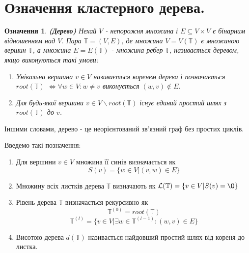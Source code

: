 \documentclass[12pt]{report}
\begin{document}
	\section{Означення кластерного дерева.}
	\newtheorem{Def}{Означення}[chapter]
	\begin{Def}
	{\bf (Дерево)} Нехай $V$ - непорожня множина і $E\subseteq V\times V$ є бінарним відношенням над $V$. Пара $\mathbb{T}=(V,E)$, де множина $V=V(\mathbb{T})$ є множиною вершин $\mathbb{T}$, а множина $E=E(\mathbb{T})$ - множина ребер $\mathbb{T}$, називається деревом, якщо виконуються такі умови:
	\begin{enumerate}
		\item[-] Унікальна вершина $v\in V$ називається коренем дерева і позначається $root(\mathbb{T})$ $\Leftrightarrow \forall w\in V:w\not=v$ виконується $(w,v)\not\in E$.
		\item[-] Для будь-якої вершини $v\in V\backslash root(\mathbb{T})$ існує єдиний простий шлях з $root(\mathbb{T})$ до $v$.
	\end{enumerate}

	\end{Def}
	Іншими словами, дерево - це неорієнтований зв'язний граф без простих циклів.
	\par Введемо такі позначення:
	\begin{enumerate}
		\item[$\bullet$] Для вершини $v\in V$ множина її синів визначається як $$S(v)=\{w\in V |(v,w)\in E \}$$
		\item[$\bullet$] Множину всіх листків дерева $\mathbb{T}$ визначають як $\mathcal{L}(\mathbb{T})=\{v\in V|S(v)=\O \}$
		\item[$\bullet$] Рівень дерева $\mathbb{T}$ визначається рекурсивно як $$\mathbb{T}^{(0)}=root(\mathbb{T})$$
		$$\mathbb{T}^{(l)}=\{v \in V|\exists w\in \mathbb{T}^{(l-1)}:(w,v)\in E\}$$
		\item[$\bullet$] Висотою дерева $d(\mathbb{T})$ називається найдовший простий шлях від кореня до листка.
	\end{enumerate}
	
\end{document}
